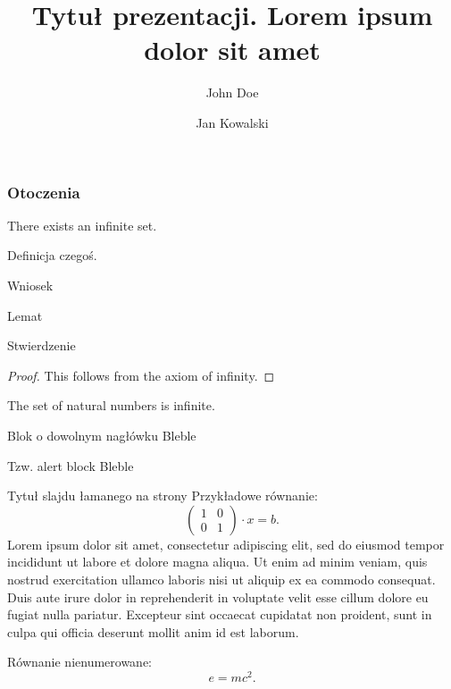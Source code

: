 \documentclass[aspectratio=169]{beamer}
\title{Tytuł prezentacji. Lorem ipsum dolor sit amet}
\author{John Doe \and  Jan Kowalski}
\date{} %
\begin{document}
\sloppy

{
\maketitleframe 
}




\begin{frame}[allowframebreaks]
  \frametitle{Otoczenia}
  \begin{theorem}
    There exists an infinite set.
  \end{theorem}
  \begin{definition}
  Definicja czegoś.
  \end{definition}
  \begin{corollary}
  Wniosek
  \end{corollary}
  \begin{lemma}
  Lemat
  \end{lemma}
  \begin{proposition}
  Stwierdzenie
  \end{proposition}
  \begin{proof}
    This follows from the axiom of infinity.
  \end{proof}
  \begin{example}
    The set of natural numbers is infinite.
  \end{example}
  \begin{block}{Blok o dowolnym nagłówku}
  Bleble
  \end{block}
	\begin{alertblock}{Tzw. alert block}
  		Bleble
	\end{alertblock}
\end{frame}

\begin{frame}[allowframebreaks]{Tytuł slajdu łamanego na strony}
Przykładowe równanie:
  \begin{equation}
    \begin{pmatrix}
    1 & 0 \\
    0 & 1
    \end{pmatrix} \cdot x = b.
  \end{equation}
  \color{black}
Lorem ipsum dolor  sit amet, consectetur  adipiscing elit, sed do eiusmod tempor incididunt ut labore et dolore magna aliqua. Ut enim ad minim  veniam, quis nostrud exercitation ullamco laboris nisi ut aliquip ex ea commodo consequat. Duis aute irure dolor in reprehenderit  in voluptate  velit esse cillum dolore eu fugiat nulla pariatur.  Excepteur sint occaecat cupidatat non proident, sunt in culpa qui officia deserunt mollit anim id est laborum.

Równanie nienumerowane:
\[
e = mc^2.
\]
\end{frame}
\end{document}
